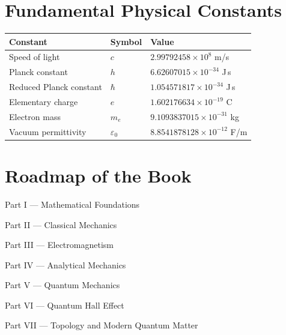 \documentclass[11pt,a4paper,openany]{book}
\begin{document}

\chapter*{Fundamental Physical Constants}

\begin{tabular}{lll}
	Constant & Symbol & Value\\
	\hline
	Speed of light & $c$ & $2.99792458\times10^8$ m/s\\
	Planck constant & $h$ & $6.62607015\times10^{-34}$ J\,s\\
	Reduced Planck constant & $\hbar$ & $1.054571817\times10^{-34}$ J\,s\\
	Elementary charge & $e$ & $1.602176634\times10^{-19}$ C\\
	Electron mass & $m_e$ & $9.1093837015\times10^{-31}$ kg\\
	Vacuum permittivity & $\varepsilon_0$ & $8.8541878128\times10^{-12}$ F/m\\
\end{tabular}


\chapter*{Roadmap of the Book}

Part I --- Mathematical Foundations

Part II --- Classical Mechanics

Part III --- Electromagnetism

Part IV --- Analytical Mechanics

Part V --- Quantum Mechanics

Part VI --- Quantum Hall Effect

Part VII --- Topology and Modern Quantum Matter

\cleardoublepage
	
	
	
\mainmatter
\end{document}
